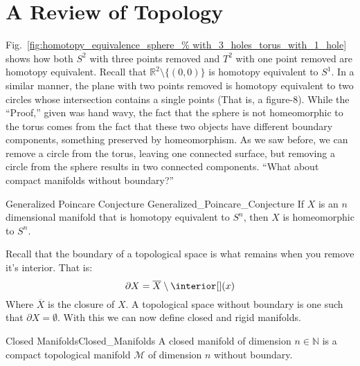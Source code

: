 \documentclass{book}                                                           %
\begin{document}
        \section{A Review of Topology}
            Fig.~\ref{fig:homotopy_equivalence_sphere_%
                           with_3_holes_torus_with_1_hole} shows how both
            $S^{2}$ with three points removed and $T^{2}$ with one point removed
            are homotopy equivalent. Recall that
            $\mathbb{R}^{2}\setminus \{(0,0)\}$ is homotopy equivalent to
            $S^{1}$. In a similar manner, the plane with two points removed is
            homotopy equivalent to two circles whose intersection contains a
            single points (That is, a figure-$8$). While the ``Proof,'' given
            was hand wavy, the fact that the sphere is not homeomorphic to the
            torus comes from the fact that these two objects have different
            boundary components, something preserved by homeomorphism. As we
            saw before, we can remove a circle from the torus, leaving one
            connected surface, but removing a circle from the sphere results in 
            two connected components. ``What about compact manifolds without
            boundary?''
            \begin{ltheorem}{Generalized Poincare Conjecture}
                            {Generalized_Poincare_Conjecture}
                If $X$ is an $n$ dimensional manifold that
                is homotopy equivalent to $S^{n}$, then $X$
                is homeomorphic to $S^{n}$.
            \end{ltheorem}
            \vspace{5pt}
            Recall that the boundary of a topological space
            is what remains when you remove it's interior.
            That is:
            \begin{equation}
                \partial{X}=\overline{X}\setminus\interior[](x)
            \end{equation}
            Where $\overline{X}$ is the closure of $X$.
            A topological space without boundary is one such that
            $\partial{X}=\emptyset$. With this we can now define
            closed and rigid manifolds.
            \begin{ldefinition}{Closed Manifolds}{Closed_Manifolds}
                A closed manifold of dimension $n\in\mathbb{N}$ is
                a compact topological manifold $\mathcal{M}$ of
                dimension $n$ without boundary.
            \end{ldefinition}
\end{document}
